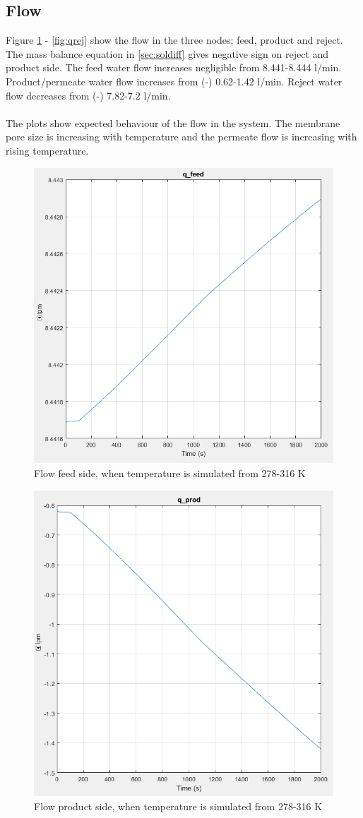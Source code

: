 \subsection{Flow}
Figure \ref{fig:qf} - \ref{fig:qrej} show the flow in the three nodes; feed, product and reject. The mass balance equation in \ref{sec:soldiff} gives negative sign on reject and product side. The feed water flow increases negligible from 8.441-8.444 l/min. Product/permeate water flow increases from (-) 0.62-1.42 l/min. Reject water flow decreases from (-) 7.82-7.2 l/min. \\
\\
The plots show expected behaviour of the flow in the system. The membrane pore size is increasing with temperature and the permeate flow is increasing with rising temperature.
\begin{figure}[H]
  \centering
  \includegraphics[width=0.6\linewidth]{q_feed.PNG}
  \caption{Flow feed side, when temperature is simulated from 278-316 K}
  \label{fig:qf}
\end{figure}
\begin{figure}[H]
  \centering
  \includegraphics[width=0.6\linewidth]{q_prod.PNG}
  \caption{Flow product side, when temperature is simulated from 278-316 K}
  \label{fig:qp}
\end{figure}
